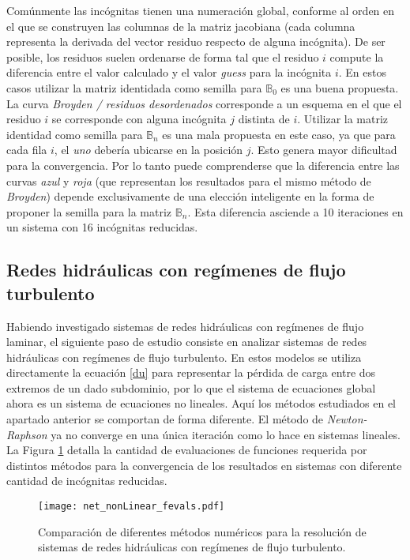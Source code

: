 Comúnmente las incógnitas tienen una numeración global, conforme al orden en el que se construyen las columnas de la matriz jacobiana
(cada columna representa la derivada del vector residuo respecto de alguna incógnita).
De ser posible, los residuos suelen ordenarse de forma tal que el residuo $i$ compute la diferencia entre el valor calculado y el valor \textit{guess} para la incógnita $i$.
En estos casos utilizar la matriz identidada como semilla para $\mathbb{B}_{0}$ es una buena propuesta.
La curva \textit{Broyden / residuos desordenados} corresponde a un esquema en el que el residuo $i$ se corresponde con alguna incógnita $j$ distinta de $i$.
Utilizar la matriz identidad como semilla para $\mathbb{B}_n$ es una mala propuesta en este caso,
ya que para cada fila $i$, el \textit{uno} debería ubicarse en la posición $j$.
Esto genera mayor dificultad para la convergencia.
Por lo tanto puede comprenderse que la diferencia entre las curvas \textit{azul} y \textit{roja} (que representan los resultados para el mismo método de \textit{Broyden})
depende exclusivamente de una elección inteligente en la forma de proponer la semilla para la matriz $\mathbb{B}_n$.
Esta diferencia asciende a 10 iteraciones en un sistema con 16 incógnitas reducidas.

\subsection*{Redes hidráulicas con regímenes de flujo turbulento}
\label{turbulent}

Habiendo investigado sistemas de redes hidráulicas con regímenes de flujo laminar,
el siguiente paso de estudio consiste en analizar sistemas de redes hidráulicas con regímenes de flujo turbulento.
En estos modelos se utiliza directamente la ecuación \ref{du} para representar la pérdida de carga entre dos extremos de un dado subdominio,
por lo que el sistema de ecuaciones global ahora es un sistema de ecuaciones no lineales.
Aquí los métodos estudiados en el apartado anterior se comportan de forma diferente.
El método de \textit{Newton-Raphson} ya no converge en una única iteración como lo hace en sistemas lineales.
La Figura \ref{net_nonLinear_fevals} detalla la cantidad de evaluaciones de funciones requerida por distintos métodos
para la convergencia de los resultados en sistemas con diferente cantidad de incógnitas reducidas.

\begin{figure}[ht]
\centering
\texttt{[image: net\_nonLinear\_fevals.pdf]}
\caption[Comparación de diferentes métodos numéricos para la resolución de sistemas de redes hidráulicas con regímenes de flujo turbulento]
{Comparación de diferentes métodos numéricos para la resolución de sistemas de redes hidráulicas con regímenes de flujo turbulento.}  
\label{net_nonLinear_fevals}
\end{figure}

